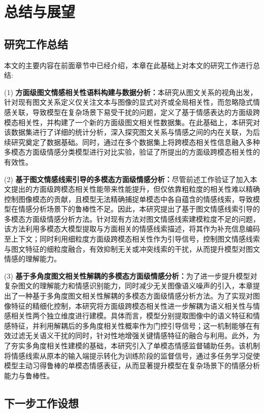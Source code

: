 \chapter{总结与展望}

\section{研究工作总结}
本文的主要内容在前面章节中已经介绍，本章在此基础上对本文的研究工作进行总结:

(1) \textbf{方面级图文情感相关性语料构建与数据分析：}本研究从图文关系的视角出发，针对现有图文关系定义仅关注文本与图像的显式对齐或全局相关性，而忽略隐式情感关联，导致模型在复杂场景下易受干扰的问题，定义了基于情感表达的方面级跨模态相关性，并构建了一个新的方面级图文相关性数据集。在此基础上，本研究对该数据集进行了详细的统计分析，深入探究图文关系与情感之间的内在关联，为后续研究奠定了数据基础。同时，通过在多个数据集上将跨模态相关性信息融入多种多模态方面级情感分类模型进行对比实验，验证了所提出的方面级跨模态相关性的有效性。

(2) \textbf{基于图文情感线索引导的多模态方面级情感分析：}尽管前述工作验证了加入本文提出的方面级跨模态相关性能带来性能提升，但仅依靠粗粒度的相关性难以精确控制图像模态的贡献，且模型无法精确捕捉单模态中各自蕴含的情感线索，导致模型在情感分析场景下的鲁棒性不足。因此，本研究提出了基于图文情感线索引导的多模态方面级情感分析方法。针对现有方法对图文情感线索建模粒度不足的问题，该方法利用多模态大模型提取与方面相关的情感线索描述，将其作为补充信息编码至上下文；同时利用细粒度方面级跨模态相关性作为引导信号，控制图文情感线索与图文特征的细粒度融合，有效抑制无关或冲突线索的干扰，从而提升模型对图文情感的理解能力。

(3) \textbf{基于多角度图文相关性解耦的多模态方面级情感分析：}为了进一步提升模型对复杂图文的理解能力和情感识别能力，同时减少无关图像语义噪声的引入，本章提出了一种基于多角度图文相关性解耦的多模态方面级情感分析方法。为了实现对图像特征的精细化控制，本研究将方面级跨模态相关性进一步解耦为语义相关性与情感相关性两个独立维度进行建模。具体而言，模型分别提取图像中的语义特征和情感特征，并利用解耦后的多角度相关性概率作为门控引导信号；这一机制能够在有效过滤无关语义干扰的同时，针对性地增强关键情感特征的融合与利用。此外，为了夯实多角度相关性建模的基础，本研究引入了单模态情感监督辅助任务。该机制将情感线索从原本的输入端提示转化为训练阶段的监督信号，通过多任务学习促使模型主动习得鲁棒的单模态情感表征，从而显著提升模型在复杂场景下的情感分析能力与鲁棒性。


\section{下一步工作设想}

